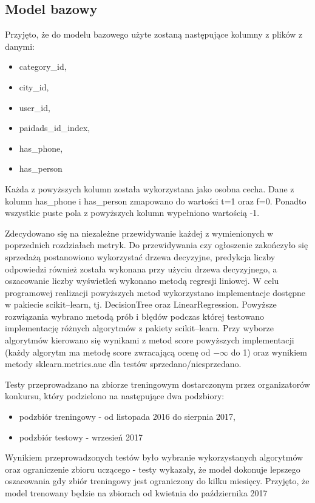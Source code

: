 \documentclass[a4paper,11pt]{article}
\begin{document}
\subsection{Model bazowy}

Przyjęto, że do modelu bazowego użyte zostaną następujące kolumny z plików z danymi:
\begin{itemize}
\item category\_id,
\item city\_id,
\item user\_id, 
\item paidads\_id\_index,
\item has\_phone, 
\item has\_person
\end{itemize}

Każda z powyższych kolumn została wykorzystana jako osobna cecha. Dane z kolumn has\_phone i has\_person zmapowano do wartości t=1 oraz f=0. Ponadto wszystkie puste pola z powyższych kolumn wypełniono wartością -1.

Zdecydowano się na niezależne przewidywanie każdej z wymienionych w poprzednich rozdziałach metryk. Do przewidywania czy ogłoszenie zakończyło się sprzedażą postanowiono wykorzystać drzewa decyzyjne, predykcja liczby odpowiedzi również została wykonana przy użyciu drzewa decyzyjnego, a oszacowanie liczby wyświetleń wykonano metodą regresji liniowej. W celu programowej realizacji powyższych metod wykorzystano implementacje dostępne w pakiecie scikit--learn, tj. DecisionTree oraz LinearRegression. Powyższe rozwiązania wybrano metodą prób i błędów podczas której testowano implementację różnych algorytmów z pakiety scikit--learn. Przy wyborze algorytmów kierowano się wynikami z metod score powyższych implementacji (każdy algorytm ma metodę score zwracającą ocenę od $-\infty$ do 1) oraz wynikiem metody sklearn.metrics.auc dla testów sprzedano/niesprzedano. 

Testy przeprowadzano na zbiorze treningowym dostarczonym przez organizatorów konkursu, który podzielono na następujące dwa podzbiory:
\begin{itemize}
\item podzbiór treningowy - od listopada 2016 do sierpnia 2017,
\item podzbiór testowy - wrzesień 2017
\end{itemize}
Wynikiem przeprowadzonych testów było wybranie wykorzystanych algorytmów oraz ograniczenie zbioru uczącego - testy wykazały, że model dokonuje lepszego oszacowania gdy zbiór treningowy jest ograniczony do kilku miesięcy. Przyjęto, że model trenowany będzie na zbiorach od kwietnia do października 2017
\end{document}
